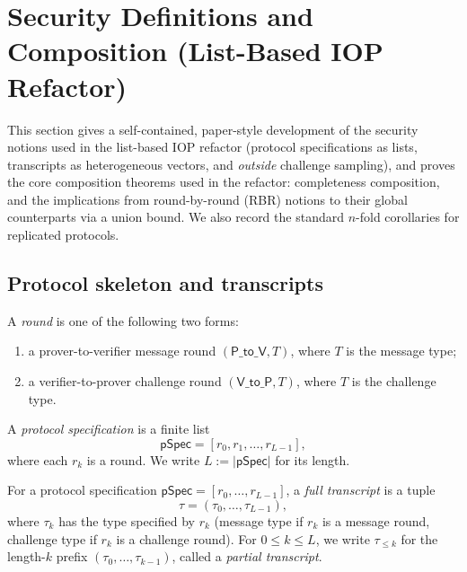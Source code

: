 \section{Security Definitions and Composition (List-Based IOP Refactor)}
\label{sec:iop_refactor_security_composition}

\providecommand{\defeq}{\mathrel{:=}}
\providecommand{\pSpec}{\mathsf{pSpec}}
\providecommand{\oSpec}{\mathsf{oSpec}}
\providecommand{\PtoV}{\mathsf{P\_to\_V}}
\providecommand{\VtoP}{\mathsf{V\_to\_P}}
\providecommand{\Transcript}{\mathsf{Transcript}}
\providecommand{\Option}{\mathsf{Option}}
\providecommand{\StmtIn}{\mathsf{StmtIn}}
\providecommand{\StmtOut}{\mathsf{StmtOut}}
\providecommand{\StmtMid}{\mathsf{StmtMid}}
\providecommand{\WitIn}{\mathsf{WitIn}}
\providecommand{\WitOut}{\mathsf{WitOut}}
\providecommand{\WitMid}{\mathsf{WitMid}}

This section gives a self-contained, paper-style development of the security notions used in the
list-based IOP refactor (protocol specifications as lists, transcripts as heterogeneous vectors, and
\emph{outside} challenge sampling), and proves the core composition theorems used in the refactor:
completeness composition, and the implications from round-by-round (RBR) notions to their global
counterparts via a union bound.  We also record the standard $n$-fold corollaries for replicated
protocols.

\subsection{Protocol skeleton and transcripts}

\begin{definition}
A \emph{round} is one of the following two forms:
\begin{enumerate}
  \item a prover-to-verifier message round $(\PtoV, T)$, where $T$ is the message type;
  \item a verifier-to-prover challenge round $(\VtoP, T)$, where $T$ is the challenge type.
\end{enumerate}
A \emph{protocol specification} is a finite list
\[
  \pSpec = [r_0, r_1, \dots, r_{L-1}],
\]
where each $r_k$ is a round. We write $L \defeq |\pSpec|$ for its length.
\end{definition}

\begin{definition}
For a protocol specification $\pSpec = [r_0,\dots,r_{L-1}]$, a \emph{full transcript} is a tuple
\[
  \tau = (\tau_0,\dots,\tau_{L-1}),
\]
where $\tau_k$ has the type specified by $r_k$ (message type if $r_k$ is a message round, challenge
type if $r_k$ is a challenge round). For $0 \le k \le L$, we write $\tau_{\le k}$ for the length-$k$
prefix $(\tau_0,\dots,\tau_{k-1})$, called a \emph{partial transcript}.
\end{definition}

